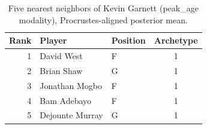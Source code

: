 \begin{table}[htbp]
  \centering\small
  \begin{tabular}{rllc}
    \toprule
    Rank & Player & Position & Archetype \\
    \midrule
    1 & David West & F & 1 \\
    2 & Brian Shaw & G & 1 \\
    3 & Jonathan Mogbo & F & 1 \\
    4 & Bam Adebayo & F & 1 \\
    5 & Dejounte Murray & G & 1 \\
    \bottomrule
  \end{tabular}
  \caption{Five nearest neighbors of Kevin Garnett (peak_age modality), Procrustes-aligned posterior mean.}
  \label{tab:Kevin_Garnett_neighbors_peak_age}
\end{table}

